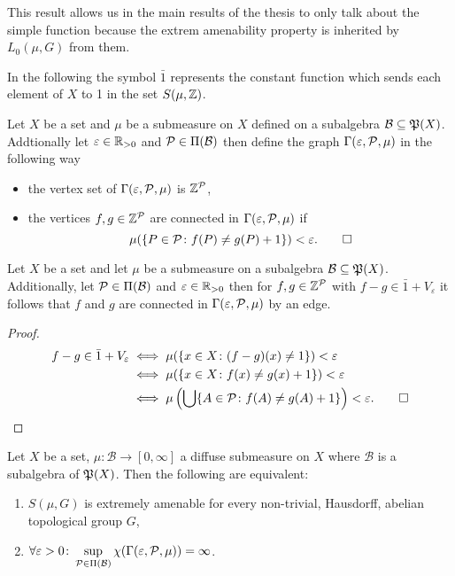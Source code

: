This result allows us in the main results of the thesis to only talk about the simple function because the extrem amenability property is inherited by $L_0(\mu, G)$ from them.

In the following the symbol $\bar{1}$ represents the constant function which sends each element of $X$ to 1 in the set $S(\mu, \Z)$. 

\begin{defin}
  Let $X$ be a set and $\mu$ be a submeasure on $X$ defined on a subalgebra $\mathcal{B} \subseteq \PowS(X)$. Addtionally let $\varepsilon \in \R_{>0}$ and $\P \in \Pi(\mathcal{B})$ then define the graph $\Gamma(\varepsilon, \P, \mu)$ in the following way
  \begin{itemize}
    \item the vertex set of $\Gamma(\varepsilon, \P, \mu)$ is $\Z^\P$,
    \item the vertices $f, g \in \Z^\P$ are connected in $\Gamma(\varepsilon, \P, \mu)$ if \[\mu(\{P \in \P\colon f(P) \neq g(P) + 1\}) < \varepsilon.\qedhere\]
  \end{itemize}
\end{defin}

\begin{lemma}\label{lem:1}
  Let $X$ be a set and let $\mu$ be a submeasure on a subalgebra $\mathcal{B} \subseteq \PowS(X)$. Additionally, let $\P \in \Pi(\mathcal{B})$ and $\varepsilon \in \R_{>0}$ then for $f,g \in \Z^\P$ with $f - g \in \bar{1} + V_\varepsilon$ it follows that $f$ and $g$ are connected in $\Gamma(\varepsilon, \P, \mu)$ by an edge.
\end{lemma}

\begin{proof}
  \begin{align*}
    f - g \in \bar{1} + V_\varepsilon   &\iff \mu(\{x \in X\colon (f-g)(x) \neq 1\}) < \varepsilon \\
                                      &\iff \mu(\{x \in X\colon f(x) \neq g(x) + 1\}) < \varepsilon \\
                                      &\iff \mu\left(\bigcup \{A \in \P \colon f(A) \neq g(A) + 1\}\right) < \varepsilon.\qedhere
  \end{align*}
\end{proof}

\begin{thm}\label{thm:colve}
  Let $X$ be a set, $\mu\colon \mathcal{B} \to [0, \infty]$ a diffuse submeasure on $X$ where $\mathcal{B}$ is a subalgebra of $\PowS(X)$. Then the following are equivalent:
  \begin{enumerate}
    \item $S(\mu, G)$ is extremely amenable for every non-trivial, Hausdorff, abelian topological group $G$,
    \item $\forall \varepsilon > 0\colon \sup\limits_{\P \in \Pi(\mathcal{B})}\chi(\Gamma(\varepsilon, \mathcal{P}, \mu)) = \infty$.
  \end{enumerate}
\end{thm}

